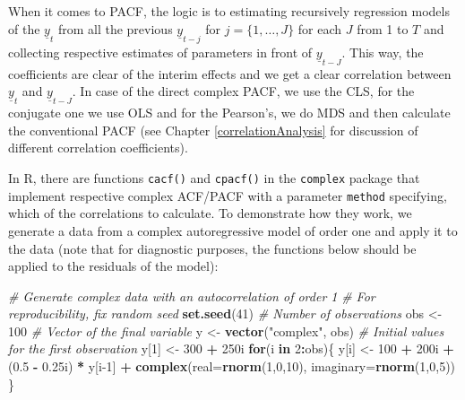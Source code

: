 \documentclass[
]{book}
\newenvironment{Shaded}{\begin{snugshade}}{\end{snugshade}}
\newcommand{\CommentTok}[1]{\textcolor[rgb]{0.56,0.35,0.01}{\textit{#1}}}
\newcommand{\ControlFlowTok}[1]{\textcolor[rgb]{0.13,0.29,0.53}{\textbf{#1}}}
\newcommand{\DataTypeTok}[1]{\textcolor[rgb]{0.13,0.29,0.53}{#1}}
\newcommand{\DecValTok}[1]{\textcolor[rgb]{0.00,0.00,0.81}{#1}}
\newcommand{\FloatTok}[1]{\textcolor[rgb]{0.00,0.00,0.81}{#1}}
\newcommand{\KeywordTok}[1]{\textcolor[rgb]{0.13,0.29,0.53}{\textbf{#1}}}
\newcommand{\NormalTok}[1]{#1}
\newcommand{\OperatorTok}[1]{\textcolor[rgb]{0.81,0.36,0.00}{\textbf{#1}}}
\newcommand{\StringTok}[1]{\textcolor[rgb]{0.31,0.60,0.02}{#1}}
\begin{document}
When it comes to PACF, the logic is to estimating recursively regression models of the \(\underline{y}_{t}\) from all the previous \(\underline{y}_{t-j}\) for \(j=\{1, \dots, J\}\) for each \(J\) from 1 to \(T\) and collecting respective estimates of parameters in front of \(\underline{y}_{t-J}\). This way, the coefficients are clear of the interim effects and we get a clear correlation between \(\underline{y}_{t}\) and \(\underline{y}_{t-J}\). In case of the direct complex PACF, we use the CLS, for the conjugate one we use OLS and for the Pearson's, we do MDS and then calculate the conventional PACF (see Chapter \ref{correlationAnalysis} for discussion of different correlation coefficients).

In R, there are functions \texttt{cacf()} and \texttt{cpacf()} in the \texttt{complex} package that implement respective complex ACF/PACF with a parameter \texttt{method} specifying, which of the correlations to calculate. To demonstrate how they work, we generate a data from a complex autoregressive model of order one and apply it to the data (note that for diagnostic purposes, the functions below should be applied to the residuals of the model):

\begin{Shaded}
\begin{Highlighting}[]
\CommentTok{\# Generate complex data with an autocorrelation of order 1}
\CommentTok{\# For reproducibility, fix random seed}
\KeywordTok{set.seed}\NormalTok{(}\DecValTok{41}\NormalTok{)}
\CommentTok{\# Number of observations}
\NormalTok{obs \textless{}{-}}\StringTok{ }\DecValTok{100}
\CommentTok{\# Vector of the final variable}
\NormalTok{y \textless{}{-}}\StringTok{ }\KeywordTok{vector}\NormalTok{(}\StringTok{"complex"}\NormalTok{, obs)}
\CommentTok{\# Initial values for the first observation}
\NormalTok{y[}\DecValTok{1}\NormalTok{] \textless{}{-}}\StringTok{ }\DecValTok{300} \OperatorTok{+}\StringTok{ }\NormalTok{250i}
\ControlFlowTok{for}\NormalTok{(i }\ControlFlowTok{in} \DecValTok{2}\OperatorTok{:}\NormalTok{obs)\{}
\NormalTok{    y[i] \textless{}{-}}\StringTok{ }\DecValTok{100} \OperatorTok{+}\StringTok{ }\NormalTok{200i }\OperatorTok{+}\StringTok{ }\NormalTok{(}\FloatTok{0.5} \OperatorTok{{-}}\StringTok{ }\FloatTok{0.25}\NormalTok{i) }\OperatorTok{*}\StringTok{ }\NormalTok{y[i}\DecValTok{{-}1}\NormalTok{] }\OperatorTok{+}
\StringTok{        }\KeywordTok{complex}\NormalTok{(}\DataTypeTok{real=}\KeywordTok{rnorm}\NormalTok{(}\DecValTok{1}\NormalTok{,}\DecValTok{0}\NormalTok{,}\DecValTok{10}\NormalTok{), }\DataTypeTok{imaginary=}\KeywordTok{rnorm}\NormalTok{(}\DecValTok{1}\NormalTok{,}\DecValTok{0}\NormalTok{,}\DecValTok{5}\NormalTok{))}
\NormalTok{\}}
\end{Highlighting}
\end{Shaded}
\end{document}
